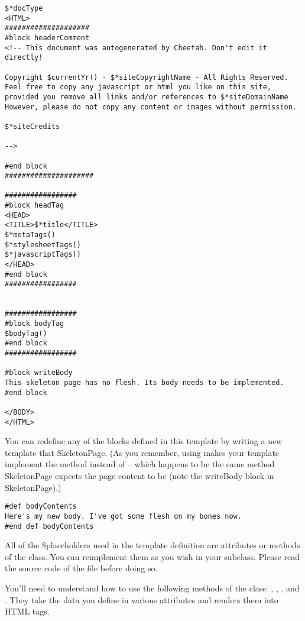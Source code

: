 \begin{verbatim}
$*docType
<HTML>
####################
#block headerComment
<!-- This document was autogenerated by Cheetah. Don't edit it directly!

Copyright $currentYr() - $*siteCopyrightName - All Rights Reserved.
Feel free to copy any javascript or html you like on this site,
provided you remove all links and/or references to $*siteDomainName
However, please do not copy any content or images without permission.

$*siteCredits

-->

#end block 
#####################

#################
#block headTag
<HEAD>
<TITLE>$*title</TITLE>
$*metaTags()
$*stylesheetTags()
$*javascriptTags()
</HEAD>
#end block 
#################


#################
#block bodyTag
$bodyTag()
#end block 
#################

#block writeBody
This skeleton page has no flesh. Its body needs to be implemented.
#end block 

</BODY>
</HTML>
\end{verbatim}

You can redefine any of the blocks defined in this template by writing a new
template that  SkeletonPage.  (As you remember, using 
 makes your template implement the 
method instead of  -- which happens to be the same method
SkeletonPage expects the page content to be (note the writeBody block in
SkeletonPage).)

\begin{verbatim}
#def bodyContents
Here's my new body. I've got some flesh on my bones now.
#end def bodyContents
\end{verbatim}


All of the \$placeholders used in the  template definition
are attributes or methods of the  class.  You can reimplement
them as you wish in your subclass.  Please read the source code of the file
 before doing so.  

You'll need to understand how to use the following methods of the
 class: , ,
, and .  They take the data you
define in various attributes and renders them into HTML tags.

